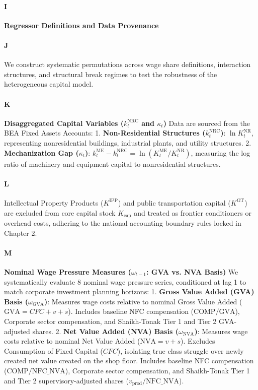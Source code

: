 \paragraph{I}
\textbf{Regressor Definitions and Data Provenance}

\paragraph{J}
We construct systematic permutations across wage share definitions, interaction structures, and structural break regimes to test the robustness of the heterogeneous capital model.

\paragraph{K}
\textbf{Disaggregated Capital Variables ($k_t^{\text{NRC}}$ and $\kappa_t$)}
Data are sourced from the BEA Fixed Assets Accounts:
1. \textbf{Non-Residential Structures ($k_t^{\text{NRC}}$)}: $\ln K_t^{\text{NR}}$, representing nonresidential buildings, industrial plants, and utility structures.
2. \textbf{Mechanization Gap ($\kappa_t$)}: $k_t^{\text{ME}} - k_t^{\text{NRC}} = \ln(K_t^{\text{ME}} / K_t^{\text{NR}})$, measuring the log ratio of machinery and equipment capital to nonresidential structures.

\paragraph{L}
Intellectual Property Products ($K^{\text{IPP}}$) and public transportation capital ($K^{\text{GT}}$) are excluded from core capital stock $K_{\text{cap}}$ and treated as frontier conditioners or overhead costs, adhering to the national accounting boundary rules locked in Chapter 2.

\paragraph{M}
\textbf{Nominal Wage Pressure Measures ($\omega_{t-1}$: GVA vs. NVA Basis)}
We systematically evaluate 8 nominal wage pressure series, conditioned at lag 1 to match corporate investment planning horizons:
1. \textbf{Gross Value Added (GVA) Basis ($\omega_{\text{GVA}}$)}: Measures wage costs relative to nominal Gross Value Added ($\text{GVA} = CFC + v + s$). Includes baseline NFC compensation ($\text{COMP}/\text{GVA}$), Corporate sector compensation, and Shaikh-Tonak Tier 1 and Tier 2 GVA-adjusted shares.
2. \textbf{Net Value Added (NVA) Basis ($\omega_{\text{NVA}}$)}: Measures wage costs relative to nominal Net Value Added ($\text{NVA} = v + s$). Excludes Consumption of Fixed Capital ($CFC$), isolating true class struggle over newly created net value created on the shop floor. Includes baseline NFC compensation ($\text{COMP}/\text{NFC\_NVA}$), Corporate sector compensation, and Shaikh-Tonak Tier 1 and Tier 2 supervisory-adjusted shares ($v_{\text{prod}}/\text{NFC\_NVA}$).

